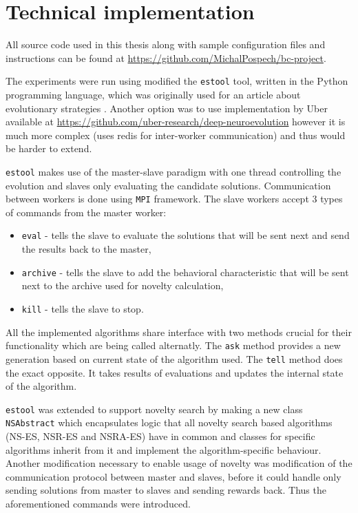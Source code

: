 \chapter{Technical implementation}

All source code used in this thesis along with sample configuration files and instructions can be found at \url{https://github.com/MichalPospech/bc-project}.

The experiments were run using modified the \texttt{estool} tool, written in the Python programming language, which was originally used for an article about evolutionary strategies \cite{ha2017evolving}. Another option was to use implementation by Uber available at \url{https://github.com/uber-research/deep-neuroevolution} however it is much more complex (uses redis for inter-worker communication) and thus would be harder to extend.

\texttt{estool} makes use of the master-slave paradigm with one thread controlling the evolution and slaves only evaluating the candidate solutions. Communication between workers is done using \texttt{MPI} framework. The slave workers accept 3 types of commands from the master worker: \begin{itemize}
    \item \texttt{eval} - tells the slave to evaluate the solutions that will be sent next and send the results back to the master,
    \item \texttt{archive} - tells the slave to add the behavioral characteristic that will be sent next to the archive used for novelty calculation,
    \item \texttt{kill} - tells the slave to stop.
\end{itemize}

All the implemented algorithms share interface with two methods crucial for their functionality which are being called alternatly. The \texttt{ask} method provides a new generation based on current state of the algorithm used. The \texttt{tell} method does the exact opposite. It takes results of evaluations and updates the internal state of the algorithm. 

\texttt{estool} was extended to support novelty search by making a new class \texttt{NSAbstract} which encapsulates logic that all novelty search based algorithms (NS-ES, NSR-ES and NSRA-ES) have in common and classes for specific algorithms inherit from it and implement the algorithm-specific behaviour. Another modification necessary to enable usage of novelty was modification of the communication protocol between master and slaves, before it could handle only sending solutions from master to slaves and sending rewards back. Thus the aforementioned commands were introduced.

